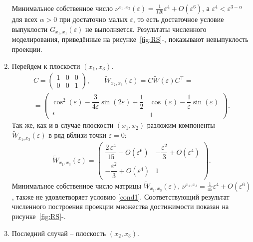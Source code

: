 \documentclass[../main.tex]{subfiles}
\begin{document}
\begin{enumerate}
        Минимальное собственное число $ \nu^{x_1,x_2}(\varepsilon) = \frac{1}{120}\varepsilon^4 + O(\varepsilon^6)$, а $ \varepsilon^4 < \varepsilon^{3-\alpha} $ для всех $ \alpha > 0 $ при достаточно малых $ \varepsilon $, то есть достаточное условие выпуклости $ G_{x_1, x_1}(\varepsilon) $ не выполняется. Результаты численного моделирования, приведённые на рисунке~\ref{fig:RS}-, показывают невыпуклость проекции. 
        \item Перейдем к плоскости $ (x_1,x_3) $. 
        \begin{gather*}
            C = \begin{pmatrix}
                1 & 0 & 0 \\
                0 & 0 & 1
            \end{pmatrix}, \qquad
            \widetilde{W}_{x_2,x_3}(\varepsilon) =  C \widetilde{W} (\varepsilon) C^{\top}  = \\ =\begin{pmatrix}
                \cos^2(\varepsilon)-\dfrac{3}{4\varepsilon}\sin(2\varepsilon)+\dfrac{1}{2} & 
                \cos\left(\varepsilon \right)-\dfrac{1}{\varepsilon} \sin\left(\varepsilon \right) \\ 
                * & 1
            \end{pmatrix}.
        \end{gather*}
        Так же, как и в случае плоскости $ (x_1,x_2) $ разложим компоненты $     \widetilde{W}_{x_1,x_3}(\varepsilon)  $ в ряд вблизи точки $ \varepsilon = 0 $:
        \begin{gather*}
            \widetilde{W}_{x_1,x_3}(\varepsilon) = \begin{pmatrix} 
                \dfrac{2\,\varepsilon ^4}{15} + O(\varepsilon^6) &
                -\dfrac{\varepsilon^2}{3}+ O(\varepsilon ^4)\\[8pt]
                -\dfrac{\varepsilon^2}{3} + O(\varepsilon^4) & 1 \end{pmatrix}.
        \end{gather*}
        Минимальное собственное число матрицы $  \widetilde{W}_{x_1,x_3}(\varepsilon)  $, $ \nu^{x_1,x_3} =   \frac{1}{45}\varepsilon^4 + O(\varepsilon^6) $, также не удовлетворяет условию \eqref{cond1}. Соответствующий результат численного построения проекции множества достижимости показан на рисунке~\ref{fig:RS}-.
        \item Последний случай -- плоскость $ (x_2,x_3) $.
        \begin{gather*}

\end{gather*}
\end{enumerate}
\end{document}
